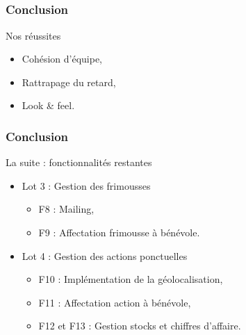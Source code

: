 \subsection{} %

\speaker{\Francois}
\begin{frame}
\frametitle{Conclusion}
\begin{block}{Nos réussites}
	\begin{itemize}
		\item Cohésion d'équipe,
		\item Rattrapage du retard,
		\item Look \& feel.
	\end{itemize}
\end{block}
\end{frame}
	
\begin{frame}
\frametitle{Conclusion}
\begin{block}{La suite : fonctionnalités restantes}
	\begin{itemize}
		\item Lot 3 : Gestion des frimousses
		\begin{itemize}
			\item F8 : Mailing,
			\item F9 : Affectation frimousse à bénévole.
		\end{itemize}
		\vspace{.5cm}
		\item Lot 4 : Gestion des actions ponctuelles
		\begin{itemize}
			\item F10 : Implémentation de la géolocalisation,
			\item F11 : Affectation action à bénévole,
			\item F12 et F13 : Gestion stocks et chiffres d'affaire.
		\end{itemize}
	\end{itemize}
\end{block}
\end{frame}
